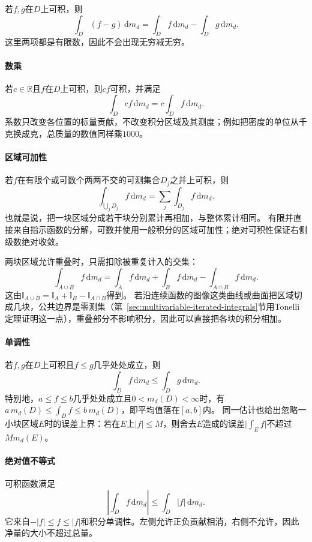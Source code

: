 若$f,g$在$D$上可积，则
\[
 \int_D(f-g)\,\mathrm dm_d=\int_Df\,\mathrm dm_d-\int_Dg\,\mathrm dm_d.
\]
这里两项都是有限数，因此不会出现无穷减无穷。

\paragraph{数乘}

若$c\in\mathbb R$且$f$在$D$上可积，则$cf$可积，并满足
\[
 \int_Dcf\,\mathrm dm_d=c\int_Df\,\mathrm dm_d.
\]
系数只改变各位置的标量贡献，不改变积分区域及其测度；例如把密度的单位从千克换成克，总质量的数值同样乘$1000$。

\paragraph{区域可加性}

若$f$在有限个或可数个两两不交的可测集合$D_j$之并上可积，则
\[
 \int_{\bigcup_jD_j}f\,\mathrm dm_d=\sum_j\int_{D_j}f\,\mathrm dm_d.
\]
也就是说，把一块区域分成若干块分别累计再相加，与整体累计相同。
有限并直接来自指示函数的分解，可数并使用一般积分的区域可加性；绝对可积性保证右侧级数绝对收敛。

两块区域允许重叠时，只需扣除被重复计入的交集：
\[
 \int_{A\cup B}f\,\mathrm dm_d
 =\int_Af\,\mathrm dm_d+\int_Bf\,\mathrm dm_d-\int_{A\cap B}f\,\mathrm dm_d.
\]
这由$\mathbb I_{A\cup B}=\mathbb I_A+\mathbb I_B-\mathbb I_{A\cap B}$得到。
若沿连续函数的图像这类曲线或曲面把区域切成几块，公共边界是零测集（第~\ref{sec:multivariable-iterated-integrals}节用Tonelli定理证明这一点），重叠部分不影响积分，因此可以直接把各块的积分相加。

\paragraph{单调性}

若$f,g$在$D$上可积且$f\leq g$几乎处处成立，则
\[
 \int_Df\,\mathrm dm_d\leq\int_Dg\,\mathrm dm_d.
\]
特别地，$a\leq f\leq b$几乎处处成立且$0<m_d(D)<\infty$时，有$a\,m_d(D)\leq\int_Df\leq b\,m_d(D)$，即平均值落在$[a,b]$内。
同一估计也给出忽略一小块区域$E$时的误差上界：若在$E$上$|f|\leq M$，则舍去$E$造成的误差$\bigl|\int_Ef\bigr|$不超过$Mm_d(E)$。

\paragraph{绝对值不等式}

可积函数满足
\[
 \left|\int_Df\,\mathrm dm_d\right|\leq\int_D|f|\,\mathrm dm_d.
\]
它来自$-|f|\leq f\leq|f|$和积分单调性。左侧允许正负贡献相消，右侧不允许，因此净量的大小不超过总量。

